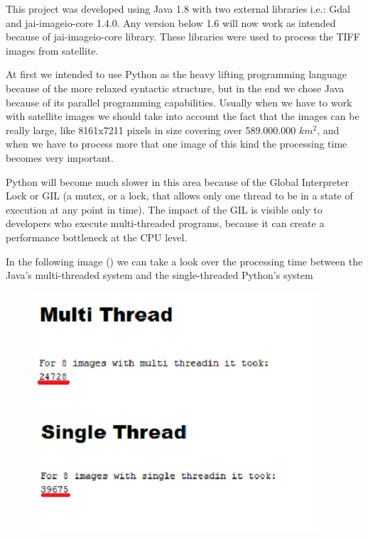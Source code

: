 \documentclass[12pt, a4paper]{report}
\begin{document}
This project was developed using Java 1.8 with two external libraries i.e.: Gdal and jai-imageio-core 1.4.0. Any version below 1.6 will now work as intended because of jai-imageio-core library. These libraries were used to process the TIFF images from satellite.
\par

At first we intended to use Python as the heavy lifting programming language because of the more relaxed syntactic structure, but in the end we chose Java because of its parallel programming capabilities. Usually when we have to work with satellite images we should take into account the fact that the images can be really large, like 8161x7211 pixels in size covering over 589.000.000 $km^2$, and when we have to process more that one image of this kind the processing time becomes very important.
\par

Python will become much slower in this area because of the Global Interpreter Lock or GIL (a mutex, or a lock, that allows only one thread to be in a state of execution at any point in time). The impact of the GIL is visible only to developers who execute multi-threaded programs, because it can create a performance bottleneck at the CPU level.
 \par
 
\bigskip

In the following image () we can take a look over the processing time between the Java's multi-threaded system and the single-threaded Python's system
\par

\begin{figure}
	\includegraphics[scale=0.8, center]{multi_thread.png}
\end{figure}
\end{document}
